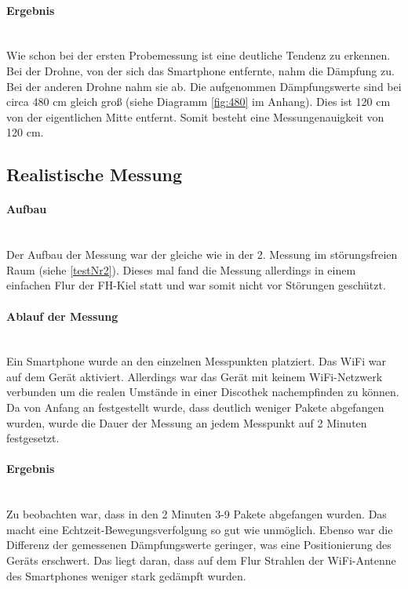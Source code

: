 \documentclass[a4paper]{spie}  %
\begin{document}
\paragraph{Ergebnis}\mbox{}\\
Wie schon bei der ersten Probemessung ist eine deutliche Tendenz zu erkennen. Bei der Drohne, von der sich das Smartphone entfernte, nahm die Dämpfung zu. Bei der anderen Drohne nahm sie ab. Die aufgenommen Dämpfungswerte sind bei circa 480 cm gleich groß (siehe Diagramm \ref{fig:480} im Anhang). Dies ist 120 cm von der eigentlichen Mitte entfernt. Somit besteht eine Messungenauigkeit von 120 cm.

\subsection{Realistische Messung}
\paragraph{Aufbau}\mbox{}\\
Der Aufbau der Messung war der gleiche wie in der 2. Messung im störungsfreien Raum (siehe \ref{testNr2}). Dieses mal fand die Messung allerdings in einem einfachen Flur der FH-Kiel statt und war somit nicht vor Störungen geschützt.

\paragraph{Ablauf der Messung}\mbox{}\\
Ein Smartphone wurde an den einzelnen Messpunkten platziert. Das WiFi war auf dem Gerät aktiviert. Allerdings war das Gerät mit keinem WiFi-Netzwerk verbunden um die realen Umstände in einer Discothek nachempfinden zu können. Da von Anfang an festgestellt wurde, dass deutlich weniger Pakete abgefangen wurden, wurde die Dauer der Messung an jedem Messpunkt auf 2 Minuten festgesetzt.

\paragraph{Ergebnis}\mbox{}\\
Zu beobachten war, dass in den 2 Minuten 3-9 Pakete abgefangen wurden. Das macht eine Echtzeit-Bewegungsverfolgung so gut wie unmöglich. Ebenso war die Differenz der gemessenen Dämpfungswerte geringer, was eine Positionierung des Geräts erschwert. Das liegt daran, dass auf dem Flur Strahlen der WiFi-Antenne des Smartphones weniger stark gedämpft wurden. 
\end{document}
